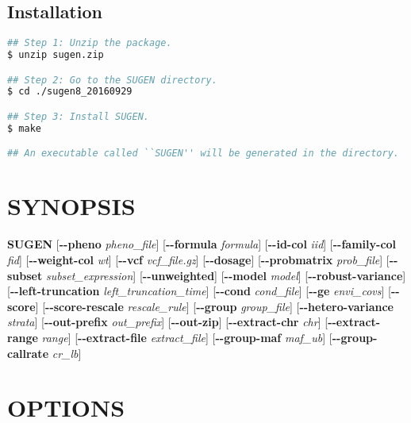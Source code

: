 \documentclass[12pt,letter]{article}
\begin{document}
\subsection{Installation}

\begin{lstlisting}[language=bash]
## Step 1: Unzip the package.
$ unzip sugen.zip

## Step 2: Go to the SUGEN directory.
$ cd ./sugen8_20160929

## Step 3: Install SUGEN.
$ make

## An executable called ``SUGEN'' will be generated in the directory.
\end{lstlisting}   

\section{SYNOPSIS}

{\bf SUGEN}
[{\bf -{}-pheno} {\it pheno\_file}]
[{\bf -{}-formula} {\it formula}]
[{\bf -{}-id-col} {\it iid}]
[{\bf -{}-family-col} {\it fid}]
[{\bf -{}-weight-col} {\it wt}]
[{\bf -{}-vcf} {\it vcf\_file.gz}]
[{\bf -{}-dosage}]
[{\bf -{}-probmatrix} {\it prob\_file}]
[{\bf -{}-subset} {\it subset\_expression}]
[{\bf -{}-unweighted}] 
[{\bf -{}-model} {\it model}]
[{\bf -{}-robust-variance}]
[{\bf -{}-left-truncation} {\it left\_truncation\_time}]
[{\bf -{}-cond} {\it cond\_file}] 
[{\bf -{}-ge} {\it envi\_covs}]
[{\bf -{}-score}]
[{\bf -{}-score-rescale} {\it rescale\_rule}]
[{\bf -{}-group} {\it group\_file}]
[{\bf -{}-hetero-variance} {\it strata}]
[{\bf -{}-out-prefix} {\it out\_prefix}]
[{\bf -{}-out-zip}]
[{\bf -{}-extract-chr} {\it chr}]
[{\bf -{}-extract-range} {\it range}]
[{\bf -{}-extract-file} {\it extract\_file}]
[{\bf -{}-group-maf} {\it maf\_ub}]
[{\bf -{}-group-callrate} {\it cr\_lb}]

\section{OPTIONS}
\end{document}
